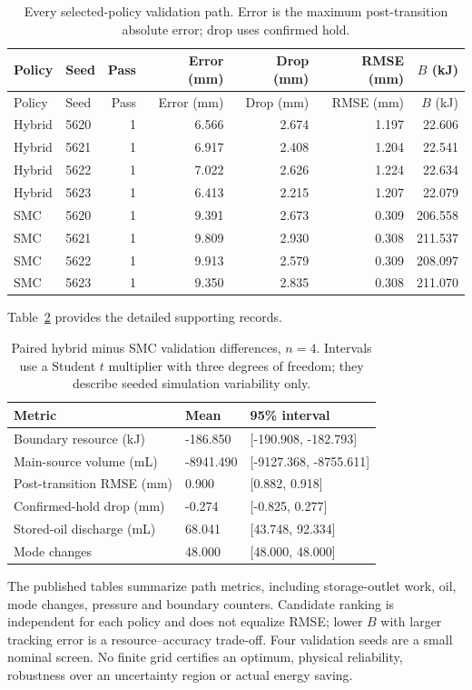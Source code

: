 \documentclass[11pt,a4paper]{article}
\begin{document}
\begin{longtable}{llrrrrr}
\caption{Every selected-policy validation path. Error is the maximum post-transition absolute error; drop uses confirmed hold.}\label{supp:longtable:13}\\\toprule
Policy & Seed & Pass & Error (mm) & Drop (mm) & RMSE (mm) & $B$ (kJ)\\\midrule\endfirsthead
\toprule Policy & Seed & Pass & Error (mm) & Drop (mm) & RMSE (mm) & $B$ (kJ)\\\midrule\endhead
Hybrid & 5620 & 1 & 6.566 & 2.674 & 1.197 & 22.606 \\
Hybrid & 5621 & 1 & 6.917 & 2.408 & 1.204 & 22.541 \\
Hybrid & 5622 & 1 & 7.022 & 2.626 & 1.224 & 22.634 \\
Hybrid & 5623 & 1 & 6.413 & 2.215 & 1.207 & 22.079 \\
SMC & 5620 & 1 & 9.391 & 2.673 & 0.309 & 206.558 \\
SMC & 5621 & 1 & 9.809 & 2.930 & 0.308 & 211.537 \\
SMC & 5622 & 1 & 9.913 & 2.579 & 0.309 & 208.097 \\
SMC & 5623 & 1 & 9.350 & 2.835 & 0.308 & 211.070 \\
\bottomrule\end{longtable}\endgroup
Table~\ref{supp:table:13} provides the detailed supporting records.
\begin{table}[H]\centering\small
\caption{Paired hybrid minus SMC validation differences, $n=4$. Intervals use a Student $t$ multiplier with three degrees of freedom; they describe seeded simulation variability only.}\label{supp:table:13}
\begin{tabularx}{\linewidth}{@{}>{\raggedright\arraybackslash}p{.48\linewidth}XX@{}}\toprule
Metric & Mean & 95\% interval\\\midrule
Boundary resource (kJ) & -186.850 & [-190.908, -182.793] \\
Main-source volume (mL) & -8941.490 & [-9127.368, -8755.611] \\
Post-transition RMSE (mm) & 0.900 & [0.882, 0.918] \\
Confirmed-hold drop (mm) & -0.274 & [-0.825, 0.277] \\
Stored-oil discharge (mL) & 68.041 & [43.748, 92.334] \\
Mode changes & 48.000 & [48.000, 48.000] \\
\bottomrule\end{tabularx}\end{table}
The published tables summarize path metrics, including storage-outlet work, oil, mode changes, pressure and boundary counters. Candidate ranking is independent for each policy and does not equalize RMSE; lower $B$ with larger tracking error is a resource--accuracy trade-off. Four validation seeds are a small nominal screen. No finite grid certifies an optimum, physical reliability, robustness over an uncertainty region or actual energy saving.
\end{document}

